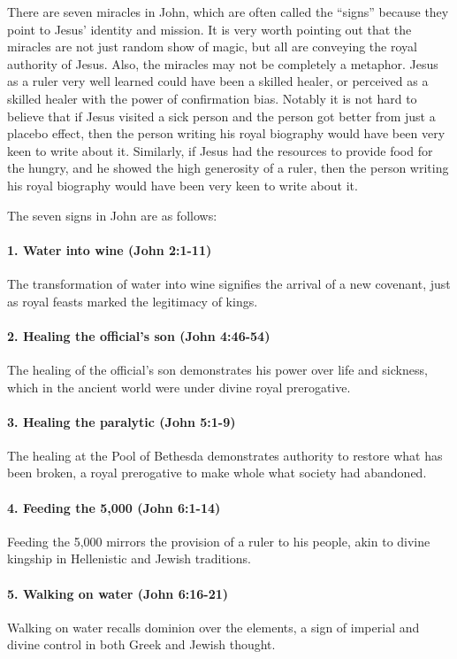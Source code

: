 There are seven miracles in John, which are often called the ``signs'' because they point to Jesus' identity and mission.
It is very worth pointing out that the miracles are not just random show of magic, but all are conveying the royal authority of Jesus.
Also, the miracles may not be completely a metaphor.
Jesus as a ruler very well learned could have been a skilled healer, or perceived as a skilled healer with the power of confirmation bias.
Notably it is not hard to believe that if Jesus visited a sick person and the person got better from just a placebo effect, then the person writing his royal biography would have been very keen to write about it.
Similarly, if Jesus had the resources to provide food for the hungry, and he showed the high generosity of a ruler, then the person writing his royal biography would have been very keen to write about it.

The seven signs in John are as follows:

\paragraph{1. Water into wine (John 2:1-11)} The transformation of water into wine signifies the arrival of a new covenant, just as royal feasts marked the legitimacy of kings.

\paragraph{2. Healing the official's son (John 4:46-54)} The healing of the official's son demonstrates his power over life and sickness, which in the ancient world were under divine royal prerogative.

\paragraph{3. Healing the paralytic (John 5:1-9)} The healing at the Pool of Bethesda demonstrates authority to restore what has been broken, a royal prerogative to make whole what society had abandoned.

\paragraph{4. Feeding the 5,000 (John 6:1-14)} Feeding the 5,000 mirrors the provision of a ruler to his people, akin to divine kingship in Hellenistic and Jewish traditions.

\paragraph{5. Walking on water (John 6:16-21)} Walking on water recalls dominion over the elements, a sign of imperial and divine control in both Greek and Jewish thought.

